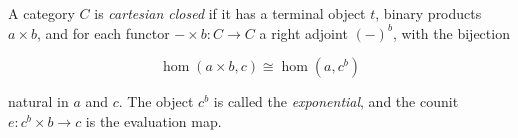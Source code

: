 A category $C$ is \emph{cartesian closed} if it has a terminal object $t$, binary products $a \times b$, and for each functor $- \times b: C \to C$ a right adjoint $(-)^b$, with the bijection

\[
\hom(a \times b, c) \cong \hom(a, c^b)
\]

natural in $a$ and $c$. The object $c^b$ is called the \emph{exponential}, and the counit $e: c^b \times b \to c$ is the evaluation map.
